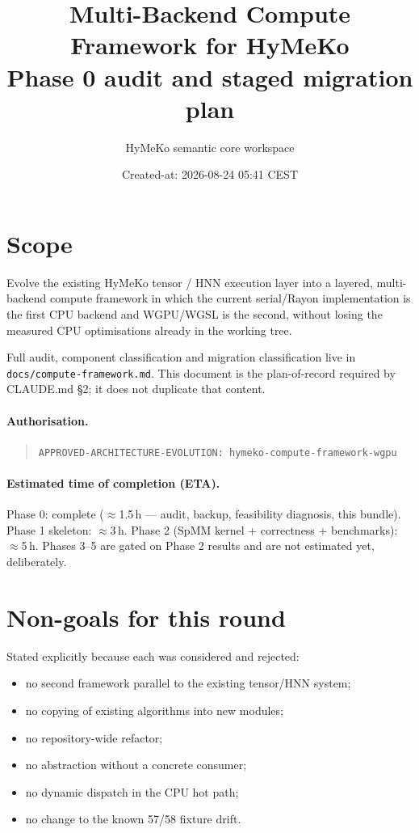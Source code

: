 \documentclass[11pt,a4paper]{article}
\title{Multi-Backend Compute Framework for HyMeKo\\
       \large Phase 0 audit and staged migration plan}
\author{HyMeKo semantic core workspace}
\date{Created-at: 2026-08-24 05:41 CEST}
\begin{document}
\maketitle

\section{Scope}

Evolve the existing HyMeKo tensor / HNN execution layer into a layered,
multi-backend compute framework in which the current serial/Rayon
implementation is the first CPU backend and WGPU/WGSL is the second, without
losing the measured CPU optimisations already in the working tree.

Full audit, component classification and migration classification live in
\texttt{docs/compute-framework.md}. This document is the plan-of-record
required by CLAUDE.md \S2; it does not duplicate that content.

\paragraph{Authorisation.}
\begin{quote}
\texttt{APPROVED-ARCHITECTURE-EVOLUTION: hymeko-compute-framework-wgpu}
\end{quote}

\paragraph{Estimated time of completion (ETA).}
Phase 0: complete ($\approx$1.5\,h --- audit, backup, feasibility diagnosis,
this bundle). Phase 1 skeleton: $\approx$3\,h. Phase 2 (SpMM kernel +
correctness + benchmarks): $\approx$5\,h. Phases 3--5 are gated on Phase 2
results and are not estimated yet, deliberately.

\section{Non-goals for this round}

Stated explicitly because each was considered and rejected:

\begin{itemize}
  \item no second framework parallel to the existing tensor/HNN system;
  \item no copying of existing algorithms into new modules;
  \item no repository-wide refactor;
  \item no abstraction without a concrete consumer;
  \item no dynamic dispatch in the CPU hot path;
  \item no change to the known 57/58 fixture drift.
\end{itemize}
\end{document}
